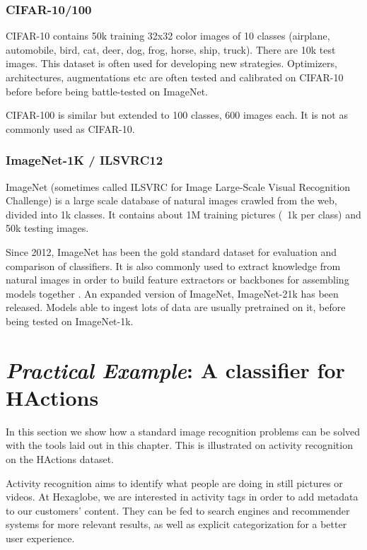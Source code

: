 \subsubsection{CIFAR-10/100}
\label{cifar10}

CIFAR-10 \citep{cifar10} contains 50k training 32x32 color images of 10 classes (airplane, automobile, bird, cat, deer, dog, frog, horse, ship, truck). There are 10k test images. This dataset is often used for developing new strategies. Optimizers, architectures, augmentations etc are often tested and calibrated on CIFAR-10 before before being battle-tested on ImageNet.

CIFAR-100 is similar but extended to 100 classes, 600 images each. It is not as commonly used as CIFAR-10.

\subsubsection{ImageNet-1K / ILSVRC12}

ImageNet (sometimes called ILSVRC for Image Large-Scale Visual Recognition Challenge) \citep{ILSVRC15,imagenet} is a large scale database of natural images crawled from the web, divided into 1k classes. It contains about 1M training pictures (~1k per class) and 50k testing images.

Since 2012, ImageNet has been the gold standard dataset for evaluation and comparison of classifiers. It is also commonly used to extract knowledge from natural images in order to build feature extractors or backbones for assembling models together \citep{imagenettransfer}. An expanded version of ImageNet, ImageNet-21k has been released. Models able to ingest lots of data are usually pretrained on it, before being tested on ImageNet-1k.

\section{\emph{\arr Practical Example}: A classifier for HActions}
\label{actionclf}

In this section we show how a standard image recognition problems can be solved with the tools laid out in this chapter. This is illustrated on activity recognition on the HActions dataset.

Activity recognition aims to identify what people are doing in still pictures or videos. At Hexaglobe, we are interested in activity tags in order to add metadata to our customers' content. They can be fed to search engines and recommender systems for more relevant results, as well as explicit categorization for a better user experience.

